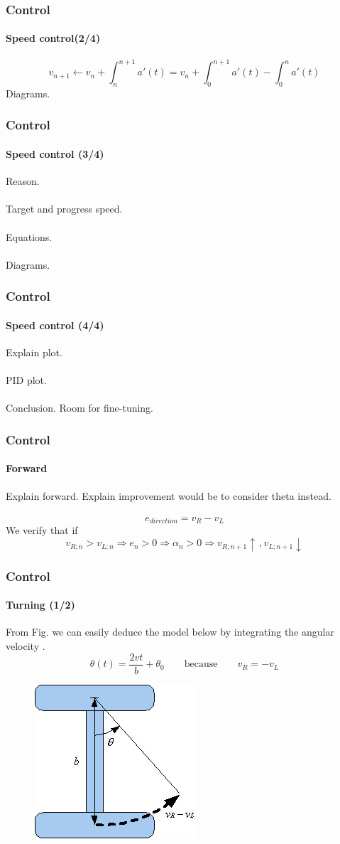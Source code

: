\documentclass{beamer}
\begin{document}

\begin{frame}
\frametitle{Control}
\framesubtitle{Speed control(2/4)}
$$
v_{n+1} \leftarrow v_n + \int_{n}^{n+1}a'(t) = v_n + \int_{0}^{n+1}a'(t) - \int_{0}^{n}a'(t)
$$
Diagrams.
\end{frame}


\begin{frame}
\frametitle{Control}
\framesubtitle{Speed control (3/4)}
Reason.\\~\\
Target and progress speed.\\~\\
Equations.\\~\\
Diagrams.
\end{frame}


\begin{frame}
\frametitle{Control}
\framesubtitle{Speed control (4/4)}
Explain plot.\\~\\
PID plot.\\~\\
Conclusion. Room for fine-tuning.
\end{frame}


\begin{frame}
\frametitle{Control}
\framesubtitle{Forward}
Explain forward. Explain improvement would be to consider theta instead.\\~\\
$$
e_{direction} = v_R - v_L
$$
We verify that if
$$
v_{R;n} > v_{L;n} \Rightarrow e_n > 0  \Rightarrow \alpha_n > 0  \Rightarrow v_{R;n+1}\uparrow \, , v_{L;n+1}\downarrow
$$
\end{frame}


\begin{frame}
\frametitle{Control}
\framesubtitle{Turning (1/2)}
From Fig. we can easily deduce the model below by integrating the angular velocity .
$$
\theta(t) = \frac{2vt}{b} + \theta_0
\qquad\text{because}\qquad	
v_R = -v_L
$$
\begin{figure}[hbtp]
\centering
\includegraphics[scale=0.5]{figures/differential-system.jpg}
\end{figure}
\end{frame}
\end{document}
